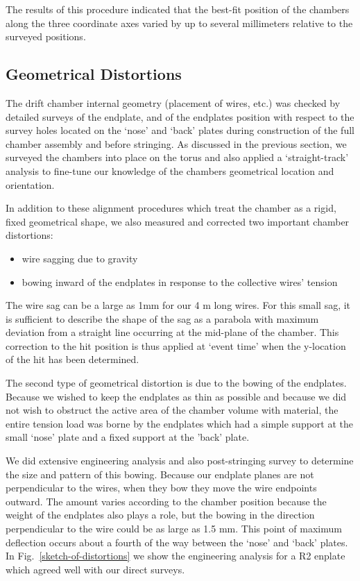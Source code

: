 The 
results of this procedure indicated that the best-fit position of the chambers 
along the three coordinate axes varied by up to several millimeters relative 
to the surveyed positions.  

\subsection{Geometrical Distortions}
The drift chamber internal geometry (placement of wires, etc.) was checked by detailed
surveys of the endplate, and of the endplates position with respect to the survey holes
located on the `nose' and `back' plates during construction of the full chamber assembly
and before stringing.
As discussed in the previous section, we surveyed the chambers into place on the
torus and also applied a `straight-track' analysis to fine-tune our knowledge
of the chambers geometrical location and orientation.

In addition to these alignment procedures which treat the chamber as a rigid, fixed
geometrical shape, we also measured and corrected two important chamber distortions:
\begin{itemize}
\item wire sagging due to gravity
\item bowing inward of the endplates in response to the collective wires' tension
\end{itemize}

The wire sag can be a large as 1mm for our 4 m long wires.  For this small
sag, it is sufficient to describe the shape of the sag as a parabola with
maximum deviation from a straight line occurring at the mid-plane of the chamber.
This correction to the hit position is thus applied at `event time' when 
the y-location of the hit has been determined.

The second type of geometrical distortion is due to the bowing of the endplates.
Because we wished to keep the endplates as thin as possible and because we did
not wish to obstruct the active area of the chamber volume with material, the
entire tension load was borne by the endplates which had a simple support at the
small `nose' plate and a fixed support at the 'back' plate.

We did extensive engineering analysis and also post-stringing survey to determine the
size and pattern of this bowing.  Because our endplate planes are not perpendicular to
the wires, when they bow they move the wire endpoints outward.  The amount varies
according to the chamber position because the weight of the endplates also plays a role,
but the bowing in the direction perpendicular to the wire could be as large as 1.5 mm.
This point of maximum deflection occurs about a fourth of the way between the `nose' and
`back' plates.  In Fig.~\ref{sketch-of-distortions} we show the engineering analysis
for a R2 enplate which agreed well with our direct surveys.

